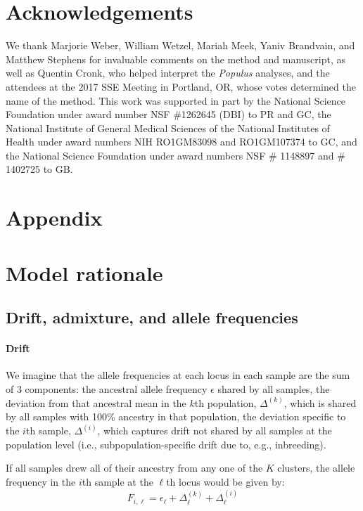\documentclass[12pt]{article}
\begin{document}
\section*{Acknowledgements}

We thank Marjorie Weber, William Wetzel, Mariah Meek, Yaniv Brandvain, and Matthew Stephens 
for invaluable comments on the method and manuscript, 
as well as Quentin Cronk, who helped interpret the \textit{Populus} analyses, 
and the attendees at the 2017 SSE Meeting in Portland, OR, whose votes determined the name of the method.
This work was supported in part by 
the National Science Foundation under award number NSF \#1262645 (DBI) to PR and GC, 
the National Institute of General Medical Sciences of the National Institutes of Health under award numbers NIH RO1GM83098 and RO1GM107374 to GC,
and the National Science Foundation under award numbers NSF \# 1148897 and \# 1402725 to GB.

\newpage
\section*{Appendix}
\renewcommand{\theequation}{A\arabic{equation}}
\setcounter{equation}{0}
\renewcommand{\thetable}{A\arabic{table}}
\setcounter{table}{0}
\renewcommand{\thefigure}{A\arabic{figure}}
\setcounter{figure}{0}


\section{Model rationale}
\subsection{Drift, admixture, and allele frequencies}
\paragraph{Drift} 
We imagine that the allele frequencies at each locus in each sample are the sum of 3 components: 
the ancestral allele frequency $\epsilon$ shared by all samples,
the deviation from that ancestral mean in the $k$th population, $\Delta^{(k)}$,
which is shared by all samples with 100\% ancestry in that population,
the deviation specific to the $i$th sample, $\Delta^{(i)}$,
which captures drift not shared by all samples at the population level
(i.e., subpopulation-specific drift due to, e.g., inbreeding).

If all samples drew all of their ancestry from any one of the $K$ clusters,
the  allele frequency in the $i$th sample at the $\ell$th locus would be given by:
\begin{equation}
F_{i,\ell} = \epsilon_{\ell} + \Delta^{(k)}_{\ell} + \Delta^{(i)}_{\ell}
\label{drift_terms_no_admix}
\end{equation}
\end{document}
